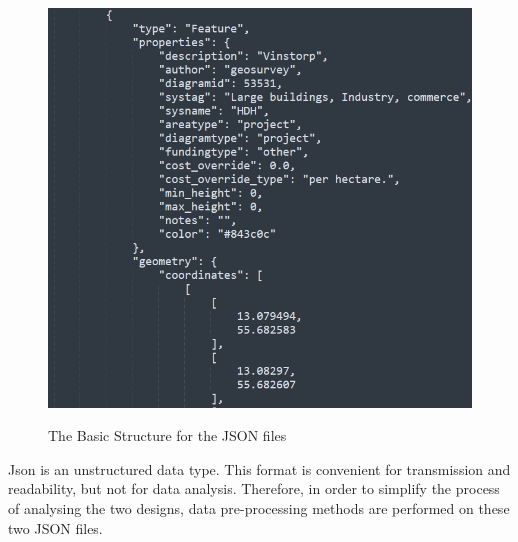 \begin{figure}[H]
\caption{The Basic Structure for the JSON files}
\centering
\includegraphics[scale=0.5]{pic1.png}
\label{json}
\end{figure}
Json is an unstructured data type. This format is convenient for transmission and readability, but not for data analysis. Therefore, in order to simplify the process of analysing the two designs, data pre-processing methods are performed on these two JSON files.




